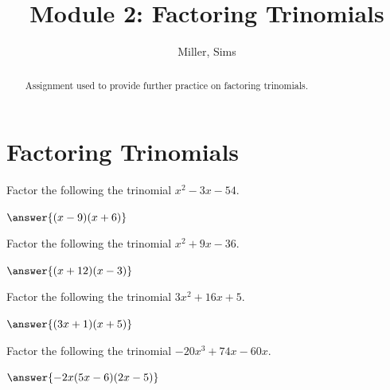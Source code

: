 \documentclass[handout]{ximera}
\title{Module 2: Factoring Trinomials}
\author{Miller, Sims}
\begin{document}
\begin{abstract}
    Assignment used to provide further practice on factoring trinomials.
\end{abstract}

\section{Factoring Trinomials}

\begin{problem}
Factor the following the trinomial $x^2-3x-54$.

$\answer{(x-9)(x+6)}$
\end{problem}

\begin{problem}
Factor the following the trinomial
$x^2+9x-36$.

$\answer{(x+12)(x-3)}$
\end{problem}

\begin{problem}
Factor the following the trinomial $3x^2+16x+5$.

$\answer{(3x+1)(x+5)}$
\end{problem}

\begin{problem}
Factor the following the trinomial $-20x^3+74x-60x$.

$\answer{-2x(5x-6)(2x-5)}$
\end{problem} 
\end{document}
